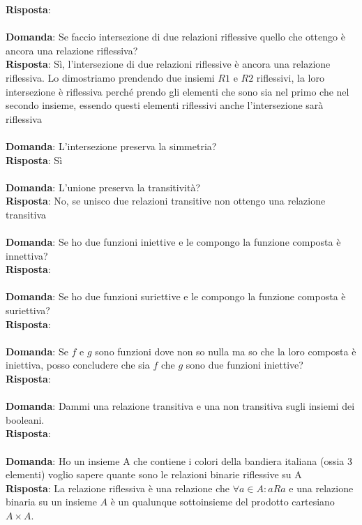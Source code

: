\documentclass{article}
\begin{document}
\textbf{Risposta}: \\ \\
\textbf{Domanda}: Se faccio intersezione di due relazioni riflessive quello che ottengo è ancora una relazione riflessiva? \\
\textbf{Risposta}: Sì, l'intersezione di due relazioni riflessive è ancora una relazione riflessiva. Lo dimostriamo prendendo due insiemi $R1$ e $R2$ riflessivi, la loro intersezione è riflessiva perché prendo gli elementi che sono sia nel primo che nel secondo insieme, essendo questi elementi riflessivi anche l'intersezione sarà riflessiva \\ \\
\textbf{Domanda}: L'intersezione preserva la simmetria? \\
\textbf{Risposta}: Sì \\ \\
\textbf{Domanda}: L'unione preserva la transitività? \\
\textbf{Risposta}: No, se unisco due relazioni transitive non ottengo una relazione transitiva \\ \\
\textbf{Domanda}: Se ho due funzioni iniettive e le compongo la funzione composta è innettiva? \\
\textbf{Risposta}: \\ \\
\textbf{Domanda}: Se ho due funzioni suriettive e le compongo la funzione composta è suriettiva? \\
\textbf{Risposta}: \\ \\
\textbf{Domanda}: Se $f$ e $g$ sono funzioni dove non so nulla ma so che la loro composta è iniettiva, posso concludere che sia $f$ che $g$ sono due funzioni iniettive? \\
\textbf{Risposta}: \\ \\
\textbf{Domanda}: Dammi una relazione transitiva e una non transitiva sugli insiemi dei booleani. \\
\textbf{Risposta}: \\ \\
\textbf{Domanda}: Ho un insieme A che contiene i colori della bandiera italiana (ossia 3 elementi) voglio sapere quante sono le relazioni binarie riflessive su A\\
\textbf{Risposta}: La relazione riflessiva è una relazione che $\forall a \in A: aRa$ e una relazione binaria su un insieme $A$ è un qualunque sottoinsieme del prodotto cartesiano $A \times A$. 
\end{document}

